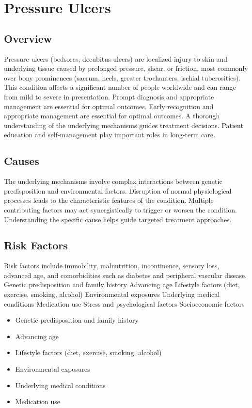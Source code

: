 \chapter{Pressure Ulcers}
\label{sec:Pressure Ulcers}

\section{Overview}
Pressure ulcers (bedsores, decubitus ulcers) are localized injury to skin and underlying tissue caused by prolonged pressure, shear, or friction, most commonly over bony prominences (sacrum, heels, greater trochanters, ischial tuberosities). This condition affects a significant number of people worldwide and can range from mild to severe in presentation. Prompt diagnosis and appropriate management are essential for optimal outcomes. Early recognition and appropriate management are essential for optimal outcomes. A thorough understanding of the underlying mechanisms guides treatment decisions. Patient education and self-management play important roles in long-term care.
\section{Causes}
The underlying mechanisms involve complex interactions between genetic predisposition and environmental factors. Disruption of normal physiological processes leads to the characteristic features of the condition. Multiple contributing factors may act synergistically to trigger or worsen the condition. Understanding the specific cause helps guide targeted treatment approaches.
\section{Risk Factors}
Risk factors include immobility, malnutrition, incontinence, sensory loss, advanced age, and comorbidities such as diabetes and peripheral vascular disease. Genetic predisposition and family history Advancing age Lifestyle factors (diet, exercise, smoking, alcohol) Environmental exposures Underlying medical conditions Medication use Stress and psychological factors Socioeconomic factors

\begin{itemize}[noitemsep]
  \item Genetic predisposition and family history
  \item Advancing age
  \item Lifestyle factors (diet, exercise, smoking, alcohol)
  \item Environmental exposures
  \item Underlying medical conditions
  \item Medication use
\end{itemize}

